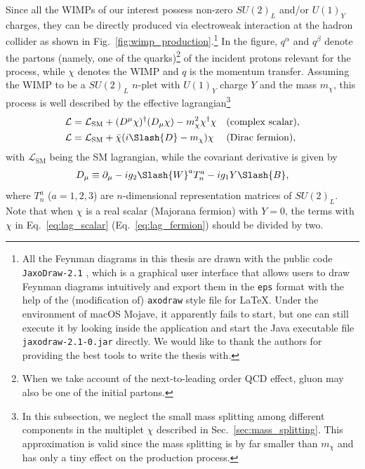 \documentclass[12pt,twoside,book]{article}
\begin{document}
Since all the WIMPs of our interest possess non-zero $SU(2)_L$ and/or $U(1)_Y$ charges, they can be directly produced via electroweak interaction at the hadron collider as shown in Fig.~\ref{fig:wimp_production}.\footnote
{
  All the Feynman diagrams in this thesis are drawn with the public code \texttt{JaxoDraw-2.1} \cite{BINOSI20091709}, which is a graphical user interface that allows users to draw Feynman diagrams intuitively and export them in the \texttt{eps} format with the help of the (modification of) \texttt{axodraw} style file for \LaTeX \cite{VERMASEREN199445}.
  Under the environment of macOS Mojave, it apparently fails to start, but one can still execute it by looking inside the application and start the Java executable file \texttt{jaxodraw-2.1-0.jar} directly.
  We would like to thank the authors for providing the best tools to write the thesis with.
}
In the figure, $q^\alpha$ and $q^\beta$ denote the partons (namely, one of the quarks)\footnote{
  When we take account of the next-to-leading order QCD effect, gluon may also be one of the initial partons.
}
of the incident protons relevant for the process, while $\chi$ denotes the WIMP and $q$ is the momentum transfer.
Assuming the WIMP to be a $SU(2)_L$ $n$-plet with $U(1)_Y$ charge $Y$ and the mass $m_\chi$, this process is well described by the effective lagrangian\footnote
{
  In this subsection, we neglect the small mass splitting among different components in the multiplet $\chi$ described in Sec.~\ref{sec:mass_splitting}.
  This approximation is valid since the mass splitting is by far smaller than $m_\chi$ and has only a tiny effect on the production process.
}
\begin{align}
  \mathcal{L} &= \mathcal{L}_{\mathrm{SM}} + (D^\mu \chi)^\dagger (D_\mu \chi) - m_\chi^2 \chi^\dagger \chi &
  &\text{(complex scalar)}, \label{eq:lag_scalar}\\
  \mathcal{L} &= \mathcal{L}_{\mathrm{SM}} + \bar{\chi} (i \Slash{D} - m_\chi) \chi &
  &\text{(Dirac fermion)}, \label{eq:lag_fermion}
\end{align}
with $\mathcal{L}_{\mathrm{SM}}$ being the SM lagrangian, while the covariant derivative is given by
\begin{align}
  D_\mu \equiv \partial_\mu - i g_2 \Slash{W}^a T_n^a - i g_1 Y \Slash{B},
\end{align}
where $T_n^a$ ($a=1,2,3$) are $n$-dimensional representation matrices of $SU(2)_L$.
Note that when $\chi$ is a real scalar (Majorana fermion) with $Y=0$, the terms with $\chi$ in Eq.~\eqref{eq:lag_scalar} (Eq.~\eqref{eq:lag_fermion}) should be divided by two.
\end{document}
